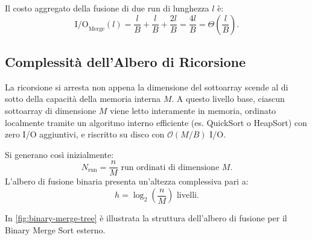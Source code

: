 Il costo aggregato della fusione di due run di lunghezza $l$ è:
\begin{equation}
  \mathrm{I/O}_{\text{Merge}}(l) = \frac{l}{B} + \frac{l}{B} + \frac{2l}{B} = \frac{4l}{B} = \Theta\left(\frac{l}{B}\right).
\end{equation}

\subsection{Complessità dell'Albero di Ricorsione}
\label{subsec:recursion-tree}

La ricorsione si arresta non appena la dimensione del sottoarray scende al di sotto della capacità della memoria interna $M$. A questo livello base, ciascun sottoarray di dimensione $M$ viene letto interamente in memoria, ordinato localmente tramite un algoritmo interno efficiente (es. QuickSort o HeapSort) con zero I/O aggiuntivi, e riscritto su disco con $\mathcal{O}(M/B)$ I/O.

Si generano così inizialmente:
\[
  N_{\mathrm{run}} = \frac{n}{M} \text{ run ordinati di dimensione } M.
\]
L'albero di fusione binaria presenta un'altezza complessiva pari a:
\begin{equation}
  h = \log_2\left(\frac{n}{M}\right) \text{ livelli}.
\end{equation}

In \autoref{fig:binary-merge-tree} è illustrata la struttura dell'albero di fusione per il Binary Merge Sort esterno.

